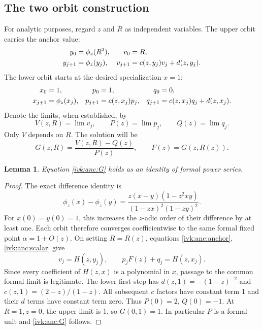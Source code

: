 \documentclass[11pt,letterpaper]{article}
\newtheorem{lemma}[theorem]{Lemma}
\theoremstyle{remark}\newtheorem{remark}[theorem]{Remark}
\newcommand{\ph}{\phi_z}
\begin{document}
\subsection{The two orbit construction}
For analytic purposes, regard $z$ and $R$ as independent variables.
The upper orbit carries the anchor value:
\begin{align}
 y_0&=\ph(R^2),&v_0&=R,\notag\\
 y_{j+1}&=\ph(y_j),&v_{j+1}&=c(z,y_j)v_j+d(z,y_j).
                                                        \label{ivk:anc:upper}
\end{align}
The lower orbit starts at the desired specialization $x=1$:
\begin{align}
 x_0&=1,&p_0&=1,&q_0&=0,\notag\\
 x_{j+1}&=\ph(x_j),&p_{j+1}&=c(z,x_j)p_j,
 &q_{j+1}&=c(z,x_j)q_j+d(z,x_j).\label{ivk:anc:lower}
\end{align}
Denote the limits, when established, by
\[
 V(z,R)=\lim v_j,\qquad P(z)=\lim p_j,\qquad Q(z)=\lim q_j.
\]
Only $V$ depends on $R$. The solution will be
\begin{equation}\label{ivk:anc:G}
 G(z,R)=\frac{V(z,R)-Q(z)}{P(z)},\qquad
 F(z)=G(z,R(z)).
\end{equation}

\begin{lemma}\label{ivk:anc:lem:formal}
Equation \eqref{ivk:anc:G} holds as an identity of formal power series.
\end{lemma}
\begin{proof}
The exact difference identity is
\begin{equation}\label{ivk:anc:difference}
 \ph(x)-\ph(y)=
 \frac{z(x-y)(1-z^2xy)}{(1-zx)^2(1-zy)^2}.
\end{equation}
For $x(0)=y(0)=1$, this increases the $z$-adic order of their
difference by at least one. Each orbit therefore converges
coefficientwise to the same formal fixed point $\alpha=1+O(z)$.
On setting $R=R(z)$, equations \eqref{ivk:anc:anchor}, \eqref{ivk:anc:scalar} give
\[
 v_j=H(z,y_j),\qquad p_jF(z)+q_j=H(z,x_j).
\]
Since every coefficient of $H(z,x)$ is a polynomial in $x$, passage
to the common formal limit is legitimate. The lower first step has
$d(z,1)=-(1-z)^{-2}$ and $c(z,1)=(2-z)/(1-z)$. All subsequent
$c$ factors have constant term 1 and their $d$ terms have constant
term zero. Thus $P(0)=2$, $Q(0)=-1$. At $R=1,z=0$, the upper
limit is 1, so $G(0,1)=1$. In particular $P$ is a formal unit and
\eqref{ivk:anc:G} follows.
\end{proof}
\end{document}
